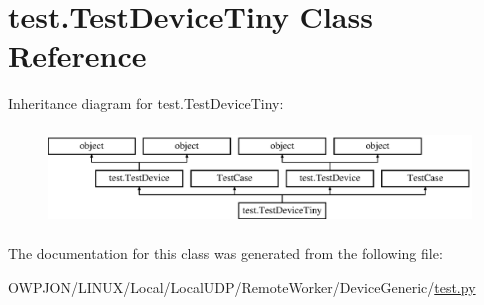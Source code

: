 \hypertarget{classtest_1_1TestDeviceTiny}{\section{test.\-Test\-Device\-Tiny Class Reference}
\label{classtest_1_1TestDeviceTiny}
}
Inheritance diagram for test.\-Test\-Device\-Tiny\-:\begin{figure}[H]
\begin{center}
\leavevmode
\includegraphics[height=2.584615cm]{classtest_1_1TestDeviceTiny}
\end{center}
\end{figure}


The documentation for this class was generated from the following file\-:\begin{DoxyCompactItemize}
\item 
O\-W\-P\-J\-O\-N/\-L\-I\-N\-U\-X/\-Local/\-Local\-U\-D\-P/\-Remote\-Worker/\-Device\-Generic/\hyperlink{LINUX_2Local_2LocalUDP_2RemoteWorker_2DeviceGeneric_2test_8py}{test.\-py}\end{DoxyCompactItemize}
